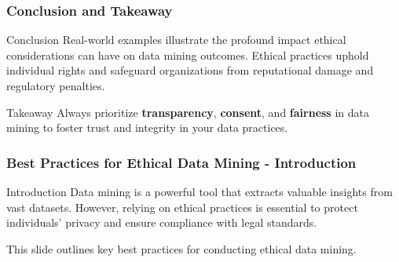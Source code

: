 \documentclass[aspectratio=169]{beamer}
\begin{document}
\begin{frame}[fragile]
  \frametitle{Conclusion and Takeaway}
  \begin{block}{Conclusion}
    Real-world examples illustrate the profound impact ethical considerations can have on data mining outcomes. Ethical practices uphold individual rights and safeguard organizations from reputational damage and regulatory penalties.
  \end{block}
  
  \begin{block}{Takeaway}
    Always prioritize \textbf{transparency}, \textbf{consent}, and \textbf{fairness} in data mining to foster trust and integrity in your data practices.
  \end{block}
\end{frame}

\begin{frame}[fragile]
    \frametitle{Best Practices for Ethical Data Mining - Introduction}
    \begin{block}{Introduction}
        Data mining is a powerful tool that extracts valuable insights from vast datasets. 
        However, relying on ethical practices is essential to protect individuals' privacy and ensure compliance with legal standards.
    \end{block}
    This slide outlines key best practices for conducting ethical data mining.
\end{frame}
\end{document}
